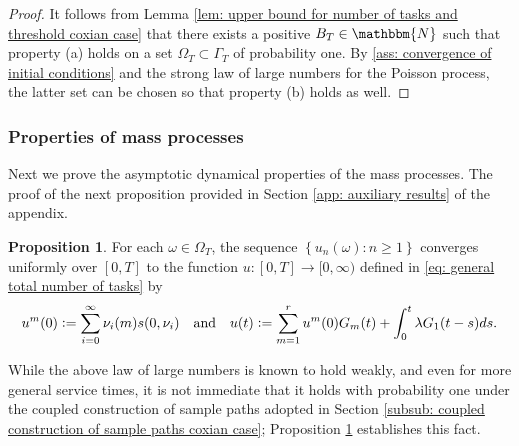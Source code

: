 \documentclass[a4paper, 12pt]{article}
\theoremstyle{definition}
\newtheorem{proposition}[theorem]{Proposition}
\newcommand{\map}[3]{#1 : #2 \longrightarrow #3}
\newcommand{\set}[2]{\left\{#1 : #2\right\}}
\newcommand{\defeq}{\vcentcolon=}
\newcommand{\N}{\mathbbm{N}}
\begin{document}
\begin{proof}
It follows from Lemma \ref{lem: upper bound for number of tasks and threshold coxian case} that there exists a positive $B_T \in \N$ such that property (a) holds on a set $\Omega_T \subset \Gamma_T$ of probability one. By \eqref{ass: convergence of initial conditions} and the strong law of large numbers for the Poisson process, the latter set can be chosen so that property (b) holds as well.
%
\end{proof}

\subsubsection{Properties of mass processes}
\label{subsub: properties of mass processes}

Next we prove the asymptotic dynamical properties of the mass processes. The proof of the next proposition provided in Section \ref{app: auxiliary results} of the appendix.

\begin{proposition}
	\label{prop: total number of tasks coxian case}
	For each $\omega \in \Omega_T$, the sequence $\set{u_n(\omega)}{n \geq 1}$ converges uniformly over $[0, T]$ to the function $\map{u}{[0, T]}{[0, \infty)}$ defined in \eqref{eq: general total number of tasks} by
	\begin{equation*}
		u^m(0) \defeq \sum_{i = 0}^\infty \nu_i(m)s(0, \nu_i) \quad \text{and} \quad u(t) \defeq \sum_{m = 1}^r u^m(0)G_m(t) + \int_0^t \lambda G_1(t - s)ds.
	\end{equation*}
\end{proposition}

While the above law of large numbers is known to hold weakly, and even for more general service times, it is not immediate that it holds with probability one under the coupled construction of sample paths adopted in Section \ref{subsub: coupled construction of sample paths coxian case}; Proposition \ref{prop: total number of tasks coxian case} establishes this fact.
\end{document}
